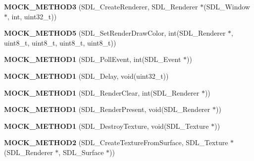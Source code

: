 \begin{DoxyCompactItemize}
\item 
\mbox{\label{classSDLMock_aaff62f5c69eeb30fcb0cdb7415163d80}} 
{\bfseries M\+O\+C\+K\+\_\+\+M\+E\+T\+H\+O\+D3} (S\+D\+L\+\_\+\+Create\+Renderer, S\+D\+L\+\_\+\+Renderer $\ast$(S\+D\+L\+\_\+\+Window $\ast$, int, uint32\+\_\+t))
\item 
\mbox{\label{classSDLMock_aa4bba6254b823069672361b6c5a95ff2}} 
{\bfseries M\+O\+C\+K\+\_\+\+M\+E\+T\+H\+O\+D5} (S\+D\+L\+\_\+\+Set\+Render\+Draw\+Color, int(S\+D\+L\+\_\+\+Renderer $\ast$, uint8\+\_\+t, uint8\+\_\+t, uint8\+\_\+t, uint8\+\_\+t))
\item 
\mbox{\label{classSDLMock_a7c65e1143e4e8bc1637e25c3cc37357e}} 
{\bfseries M\+O\+C\+K\+\_\+\+M\+E\+T\+H\+O\+D1} (S\+D\+L\+\_\+\+Poll\+Event, int(S\+D\+L\+\_\+\+Event $\ast$))
\item 
\mbox{\label{classSDLMock_a2c4e72a0b0158285c2bfb1eaec1cbb12}} 
{\bfseries M\+O\+C\+K\+\_\+\+M\+E\+T\+H\+O\+D1} (S\+D\+L\+\_\+\+Delay, void(uint32\+\_\+t))
\item 
\mbox{\label{classSDLMock_a20f0745fa1567a29273045ef430c8b22}} 
{\bfseries M\+O\+C\+K\+\_\+\+M\+E\+T\+H\+O\+D1} (S\+D\+L\+\_\+\+Render\+Clear, int(S\+D\+L\+\_\+\+Renderer $\ast$))
\item 
\mbox{\label{classSDLMock_aabda25c5efe41cc214ffcbfba4f03ffc}} 
{\bfseries M\+O\+C\+K\+\_\+\+M\+E\+T\+H\+O\+D1} (S\+D\+L\+\_\+\+Render\+Present, void(S\+D\+L\+\_\+\+Renderer $\ast$))
\item 
\mbox{\label{classSDLMock_ac25fb9830d2e388f4e681d53fc51dce9}} 
{\bfseries M\+O\+C\+K\+\_\+\+M\+E\+T\+H\+O\+D1} (S\+D\+L\+\_\+\+Destroy\+Texture, void(S\+D\+L\+\_\+\+Texture $\ast$))
\item 
\mbox{\label{classSDLMock_acc8333f8abbe99a67a13cefeecaefb32}} 
{\bfseries M\+O\+C\+K\+\_\+\+M\+E\+T\+H\+O\+D2} (S\+D\+L\+\_\+\+Create\+Texture\+From\+Surface, S\+D\+L\+\_\+\+Texture $\ast$(S\+D\+L\+\_\+\+Renderer $\ast$, S\+D\+L\+\_\+\+Surface $\ast$))
\item 
\mbox{\label{classSDLMock_adef6a49962945e23cc287caccc3a84e8}} 

\end{DoxyCompactItemize}
